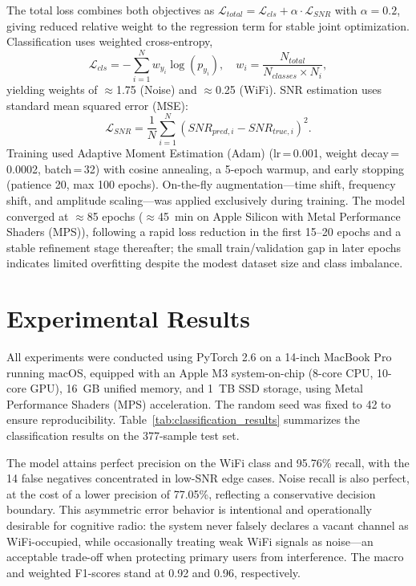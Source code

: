\documentclass[conference]{IEEEtran}
\begin{document}
The total loss combines both objectives as $\mathcal{L}_{total} = \mathcal{L}_{cls} + \alpha \cdot \mathcal{L}_{SNR}$ with $\alpha=0.2$, giving reduced relative weight to the regression term for stable joint optimization. Classification uses weighted cross-entropy,
\begin{equation}
\mathcal{L}_{cls} = -\sum_{i=1}^{N} w_{y_i} \log(p_{y_i}), \quad w_i = \frac{N_{total}}{N_{classes} \times N_i},
\end{equation}
yielding weights of $\approx$1.75 (Noise) and $\approx$0.25 (WiFi). SNR estimation uses standard mean squared error (MSE):
\begin{equation}
\mathcal{L}_{SNR} = \frac{1}{N}\sum_{i=1}^{N}(SNR_{pred,i} - SNR_{true,i})^2.
\end{equation}
Training used Adaptive Moment Estimation (Adam) (lr\,=\,0.001, weight decay\,=\,0.0002, batch\,=\,32) with cosine annealing, a 5-epoch warmup, and early stopping (patience 20, max 100 epochs). On-the-fly augmentation—time shift, frequency shift, and amplitude scaling—was applied exclusively during training. The model converged at $\approx$85 epochs ($\approx$45~min on Apple Silicon with Metal Performance Shaders (MPS)), following a rapid loss reduction in the first 15--20 epochs and a stable refinement stage thereafter; the small train/validation gap in later epochs indicates limited overfitting despite the modest dataset size and class imbalance.

\section{Experimental Results}

All experiments were conducted using PyTorch 2.6 on a 14-inch MacBook Pro running macOS, equipped with an Apple M3 system-on-chip (8-core CPU, 10-core GPU), 16~GB unified memory, and 1~TB SSD storage, using Metal Performance Shaders (MPS) acceleration. The random seed was fixed to 42 to ensure reproducibility. Table~\ref{tab:classification_results} summarizes the classification results on the 377-sample test set.

The model attains perfect precision on the WiFi class and 95.76\% recall, with the 14 false negatives concentrated in low-SNR edge cases. Noise recall is also perfect, at the cost of a lower precision of 77.05\%, reflecting a conservative decision boundary. This asymmetric error behavior is intentional and operationally desirable for cognitive radio: the system never falsely declares a vacant channel as WiFi-occupied, while occasionally treating weak WiFi signals as noise—an acceptable trade-off when protecting primary users from interference. The macro and weighted F1-scores stand at 0.92 and 0.96, respectively.
\end{document}
